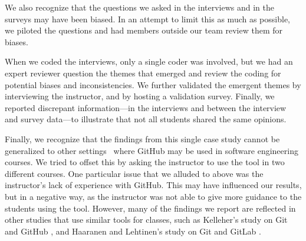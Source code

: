 We also recognize that the questions we asked in the interviews and in the surveys may have been biased. In an attempt to limit this as much as possible, we piloted the questions and had members outside our team review them for biases.

When we coded the interviews, only a single coder was involved, but we had an expert reviewer question the themes that emerged and review the coding for potential biases and inconsistencies. We further validated the emergent themes by interviewing the instructor, and by hosting a validation survey. Finally, we reported discrepant information---in the interviews and between the interview and survey data---to illustrate that not all students shared the same opinions.

Finally, we recognize that the findings from this single case study cannot be generalized to other settings~\cite{runeson2012case} where GitHub may be used in software engineering courses. We tried to offset this by asking the instructor to use the tool in two different courses. One particular issue that we alluded to above was the instructor's lack of experience with GitHub. This may have influenced our results, but in a negative way, as the instructor was not able to give more guidance to the students using the tool. However, many of the findings we report are reflected in other studies that use similar tools for classes, such as Kelleher's study on Git and GitHub \cite{kelleher2014employing}, and Haaranen and Lehtinen's study on Git and GitLab \cite{haaranen2015teaching}.
